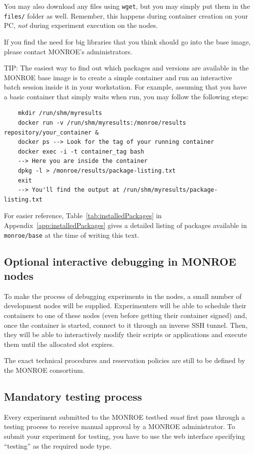 \documentclass[a4paper,10pt]{article}
\newcommand{\VerbatimFont}{\footnotesize}
\newcommand{\monroe}{MONROE}
\newcommand{\identifier}[1]{{\texttt{\small{#1}}}}
\begin{document}
You may also download any files using \identifier{wget}, but you may simply put them in the \identifier{files/} folder as well.
Remember, this happens during container creation on your PC, \emph{not} during experiment execution on the nodes.

If you find the need for big libraries that you think should go into the base image, please contact \monroe{}'s administrators.

TIP: The easiest way to find out which packages and versions are available in the \monroe{} base image is to create a simple container and run an interactive batch session inside it in your workstation.
For example, assuming that you have a basic container that simply waits when run, you may follow the following steps:
{\VerbatimFont\begin{verbatim}
	mkdir /run/shm/myresults
	docker run -v /run/shm/myresults:/monroe/results repository/your_container &
	docker ps --> Look for the tag of your running container
	docker exec -i -t container_tag bash
	--> Here you are inside the container
	dpkg -l > /monroe/results/package-listing.txt
	exit
	--> You'll find the output at /run/shm/myresults/package-listing.txt
\end{verbatim}}
For easier reference, Table~\ref{tab:installedPackages} in Appendix~\ref{app:installedPackages} gives a detailed listing of packages available in \identifier{monroe/base} at the time of writing this text.

\subsection{Optional interactive debugging in \monroe{} nodes}
To make the process of debugging experiments in the nodes, a small number of development nodes will be supplied.
Experimenters will be able to schedule their containers to one of these nodes (even before getting their container signed) and, once the container is started, connect to it through an inverse SSH tunnel.
Then, they will be able to interactively modify their scripts or applications and execute them until the allocated slot expires.

The exact technical procedures and reservation policies are still to be defined by the \monroe{} consortium.

\subsection{Mandatory testing process}
\label{subsec:testingProcess}
Every experiment submitted to the \monroe{} testbed \emph{must} first pass through a testing process to receive manual approval by a \monroe{} administrator.
To submit your experiment for testing, you have to use the web interface specifying ``testing'' as the required node type.
\end{document}
